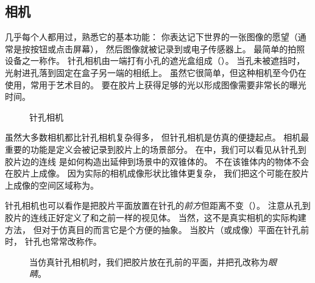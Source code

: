 \subsection{相机}\label{sub:相机}

几乎每个人都用过，熟悉它的基本功能：
你表达记下世界的一张图像的愿望（通常是按按钮或点击屏幕），
然后图像就被记录到或电子传感器上。
最简单的拍照设备之一称作。
针孔相机由一端打有小孔的遮光盒组成（）。
当孔未被遮挡时，光射进孔落到固定在盒子另一端的相纸上。
虽然它很简单，但这种相机至今仍在使用，常用于艺术目的。
要在胶片上获得足够的光以形成图像需要非常长的曝光时间。
\begin{figure}[h]
    \centering
    \caption{针孔相机}\label{fig:1.1}
\end{figure}

虽然大多数相机都比针孔相机复杂得多，
但针孔相机是仿真的便捷起点。
相机最重要的功能是定义会被记录到胶片上的场景部分。
在中，我们可以看见从针孔到胶片边的连线
是如何构造出延伸到场景中的双锥体的。
不在该锥体内的物体不会在胶片上成像。
因为实际的相机成像形状比锥体更复杂，
我们把这个可能在胶片上成像的空间区域称为。

针孔相机也可以看作是把胶片平面放置在针孔的\emph{前方}但距离不变（）。
注意从孔到胶片的连线正好定义了和之前一样的视见体。
当然，这不是真实相机的实际构建方法，
但对于仿真目的而言它是个方便的抽象。
当胶片（或成像）平面在针孔前时，
针孔也常常改称作。
\begin{figure}[h]
    \centering
    \caption{当仿真针孔相机时，我们把胶片放在孔前的平面，并把孔改称为\emph{眼睛}。}\label{fig:1.2}
\end{figure}